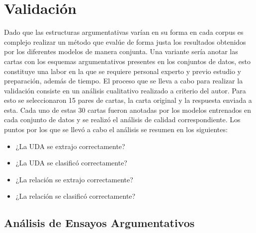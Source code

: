 \section{Validación}

Dado que las estructuras argumentativas varían en su forma en cada corpus es complejo realizar un método que evalúe de forma 
justa los resultados obtenidos por los diferentes modelos de manera conjunta. Una variante sería anotar las cartas 
con los esquemas argumentativos presentes en los conjuntos de datos, esto constituye una labor en la que se requiere
personal experto y previo estudio y preparación, además de tiempo. El proceso que se lleva a cabo para realizar la 
validación consiste en un análisis cualitativo realizado a criterio del autor. Para esto se seleccionaron 15 pares 
de cartas, la carta original y la respuesta enviada a esta. Cada uno de estas 30 cartas fueron anotadas por los modelos entrenados en cada 
conjunto de datos y se realizó el análisis de calidad correspondiente. Los puntos por los que se llevó a cabo el análisis
se resumen en los siguientes:

\begin{itemize}
	\item ¿La UDA se extrajo correctamente?
	\item ¿La UDA se clasificó correctamente?
	\item ¿La relación se extrajo correctamente?
	\item ¿La relación se clasificó correctamente?
\end{itemize}


\subsection{Análisis de Ensayos Argumentativos}


